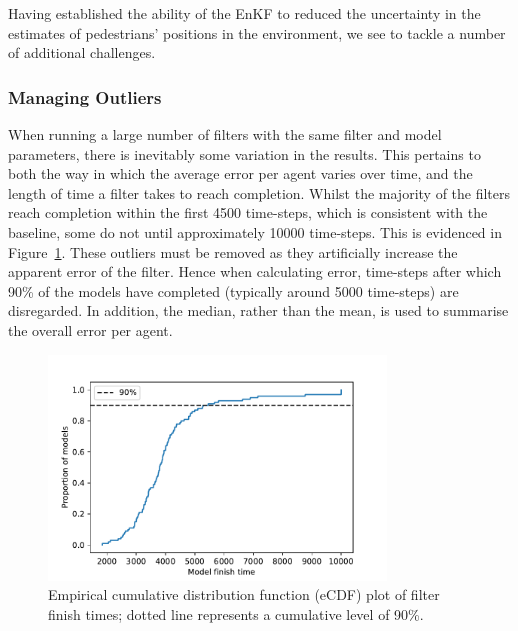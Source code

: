 \documentclass{article}
\begin{document}
Having established the ability of the EnKF to reduced the uncertainty in the estimates of pedestrians' positions in the environment, we see to tackle a number of additional challenges.


\subsubsection*{Managing Outliers}

When running a large number of filters with the same filter and model parameters, there is inevitably some variation in the results. This pertains to both the way in which the average error per agent varies over time, and the length of time a filter takes to reach completion. Whilst the majority of the filters reach completion within the first 4500 time-steps, which is consistent with the baseline, some do not until approximately 10000 time-steps. This is evidenced in Figure~\ref{fig:end_time_cdf}.  These outliers must be removed as they artificially increase the apparent error of the filter. Hence when calculating error, time-steps after which 90\% of the models have completed (typically around 5000 time-steps) are disregarded. In addition, the median, rather than the mean, is used to summarise the overall error per agent. 

\begin{figure}[hbt]
	\centering
	\includegraphics[width=0.8\textwidth]{figures/exp2/end_time_cdf.pdf}
	\caption{Empirical cumulative distribution function (eCDF) plot of filter finish times; dotted line represents a cumulative level of 90\%.}\label{fig:end_time_cdf}
\end{figure}
\end{document}
